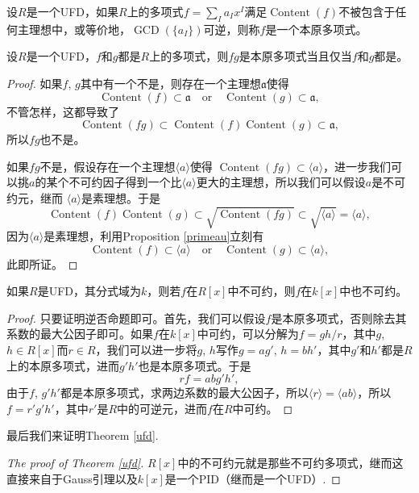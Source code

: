 \begin{para}[本原多项式]
	设$R$是一个UFD，如果$R$上的多项式$f=\sum_{I}a_Ix^I$满足$\operatorname{Content}(f)$不被包含于任何主理想中，或等价地，$\operatorname{GCD}(\{a_I\})$可逆，则称$f$是一个本原多项式。
\end{para}

\begin{lem}
	设$R$是一个UFD，$f$和$g$都是$R$上的多项式，则$fg$是本原多项式当且仅当$f$和$g$都是。
\end{lem}

\begin{proof}
	如果$f$, $g$其中有一个不是，则存在一个主理想$\mathfrak a$使得
	\[
		\operatorname{Content}(f)\subset \mathfrak a\quad \text{or}\quad \operatorname{Content}(g)\subset \mathfrak a,
	\]
	不管怎样，这都导致了
	\[
		\operatorname{Content}(fg)\subset \operatorname{Content}(f)\operatorname{Content}(g)\subset \mathfrak a,
	\]
	所以$fg$也不是。

	如果$fg$不是，假设存在一个主理想$\langle a\rangle$使得
	$
		\operatorname{Content}(fg)\subset \langle a\rangle
	$，进一步我们可以挑$a$的某个不可约因子得到一个比$\langle a\rangle$更大的主理想，所以我们可以假设$a$是不可约元，继而
	$\langle a\rangle$是素理想。于是
	\[
		\operatorname{Content}(f)\operatorname{Content}(g)\subset \sqrt{\operatorname{Content}(fg)}\subset \sqrt{\langle a\rangle}=\langle a\rangle,
	\]
	因为$\langle a\rangle$是素理想，利用Proposition \ref{primeau}立刻有
	\[
	\operatorname{Content}(f)\subset \langle a\rangle\quad \text{or}\quad \operatorname{Content}(g)\subset \langle a\rangle,
	\]
	此即所证。
\end{proof}

\begin{lem}[Gauss引理]
	如果$R$是UFD，其分式域为$k$，则若$f$在$R[x]$中不可约，则$f$在$k[x]$中也不可约。
\end{lem}

\begin{proof}
	只要证明逆否命题即可。首先，我们可以假设$f$是本原多项式，否则除去其系数的最大公因子即可。如果$f$在$k[x]$中可约，可以分解为$f=gh/r$，其中$g$, $h\in R[x]$而$r\in R$，我们可以进一步将$g$, $h$写作$g=ag'$, $h=bh'$，其中$g'$和$h'$都是$R$上的本原多项式，进而$g'h'$也是本原多项式。于是
	\[
		rf=abg'h',
	\]
	由于$f$, $g'h'$都是本原多项式，求两边系数的最大公因子，所以$\langle r\rangle =\langle ab\rangle$，所以$f=r'g'h'$，其中$r'$是$R$中的可逆元，进而$f$在$R$中可约。
\end{proof}

最后我们来证明Theorem \ref{ufd}.
\begin{proof}[The proof of Theorem \ref{ufd}]
	$R[x]$中的不可约元就是那些不可约多项式，继而这直接来自于Gauss引理以及$k[x]$是一个PID（继而是一个UFD）.
\end{proof}

